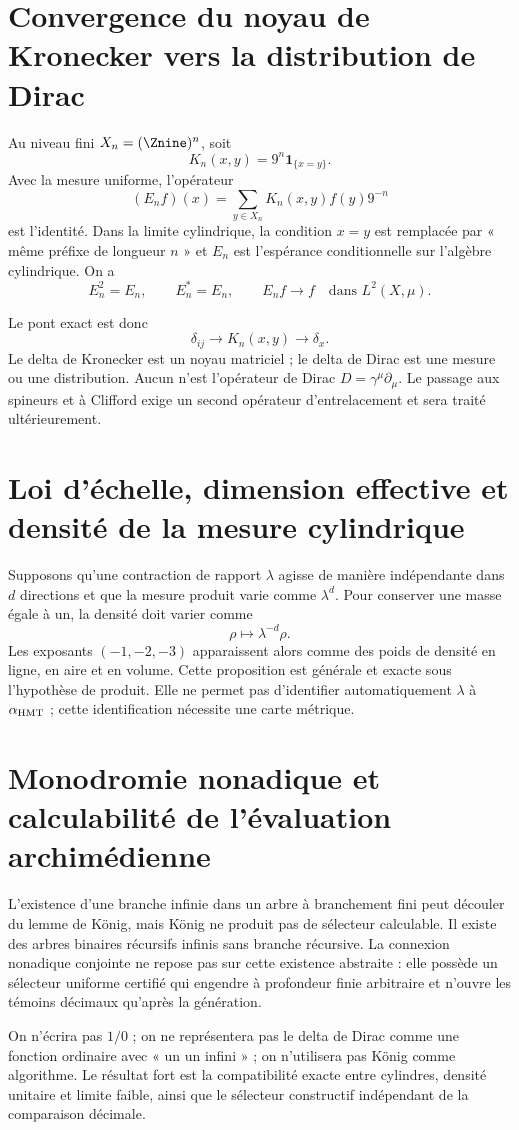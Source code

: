 \section{Convergence du noyau de Kronecker vers la distribution de Dirac}

Au niveau fini \(X_n=(\Znine)^n\), soit
\[
K_n(x,y)=9^n\mathbf1_{\{x=y\}}.
\]
Avec la mesure uniforme, l'opérateur
\[
(E_nf)(x)=\sum_{y\in X_n}K_n(x,y)f(y)9^{-n}
\]
est l'identité. Dans la limite cylindrique, la condition \(x=y\) est remplacée par
« même préfixe de longueur \(n\) » et \(E_n\) est l'espérance conditionnelle sur
l'algèbre cylindrique. On a
\[
E_n^2=E_n,\qquad E_n^*=E_n,\qquad E_nf\to f
\quad\text{dans }L^2(X,\mu).
\]

Le pont exact est donc
\[
\delta_{ij}
\longrightarrow K_n(x,y)
\longrightarrow\delta_x.
\]
Le delta de Kronecker est un noyau matriciel ; le delta de Dirac est une mesure ou
une distribution. Aucun n'est l'opérateur de Dirac
\(D=\gamma^\mu\partial_\mu\). Le passage aux spineurs et à Clifford exige
un second opérateur d'entrelacement et sera traité ultérieurement.

\section{Loi d'échelle, dimension effective et densité de la mesure cylindrique}

Supposons qu'une contraction de rapport \(\lambda\) agisse de manière indépendante
dans \(d\) directions et que la mesure produit varie comme \(\lambda^d\). Pour
conserver une masse égale à un, la densité doit varier comme
\[
\rho\longmapsto\lambda^{-d}\rho.
\]
Les exposants \((-1,-2,-3)\) apparaissent alors comme des poids de densité en ligne,
en aire et en volume. Cette proposition est générale et exacte sous l'hypothèse de
produit. Elle ne permet pas d'identifier automatiquement \(\lambda\) à
\(\alpha_{\rm HMT}\) ; cette identification nécessite une carte métrique.

\section{Monodromie nonadique et calculabilité de l'évaluation archimédienne}

L'existence d'une branche infinie dans un arbre à branchement fini peut
découler du lemme de König, mais König ne produit pas de sélecteur calculable. Il existe
des arbres binaires récursifs infinis sans branche récursive. La connexion nonadique
conjointe ne repose pas sur cette existence abstraite : elle possède un sélecteur uniforme
certifié qui engendre à profondeur finie arbitraire et n'ouvre les témoins
décimaux qu'après la génération.

\begin{falsadorBox}[title={Trois confusions interdites}]
On n'écrira pas \(1/0\) ; on ne représentera pas le delta de Dirac comme une fonction
ordinaire avec « un un infini » ; on n'utilisera pas König comme algorithme. Le résultat
fort est la compatibilité exacte entre cylindres, densité unitaire et limite
faible, ainsi que le sélecteur constructif indépendant de la comparaison décimale.
\end{falsadorBox}
